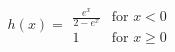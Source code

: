 

\[
h(x) = \begin{array}{ll} \frac{e^{x}} {2 - e^{x}} & \mbox{for $x < 0$} \\ 1 & \mbox{for $x \ge 0$} \end{array}
\]



